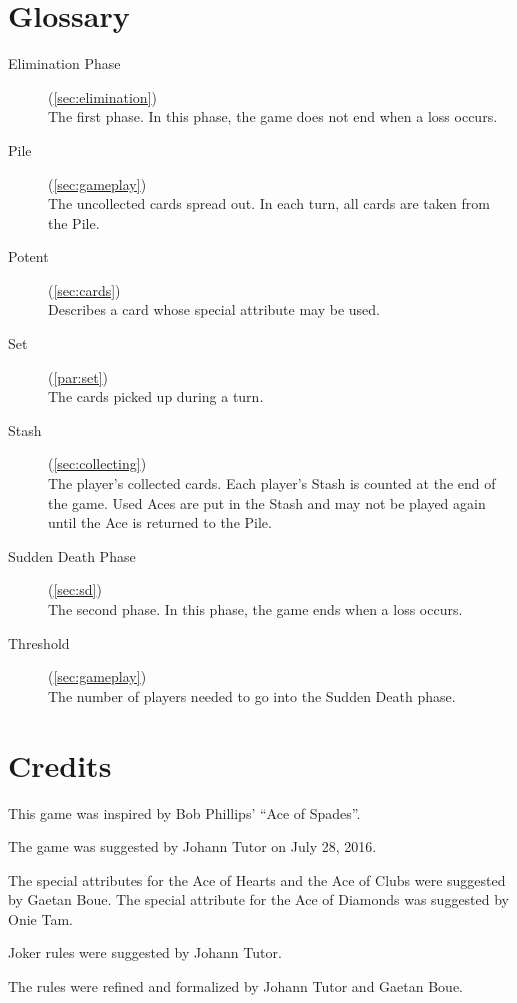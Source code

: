 \documentclass{article}
\begin{document}
\section{Glossary \label{sec:glossary}}
\begin{description}
  \item[Elimination Phase](\autoref{sec:elimination})\\
    The first phase. In this phase, the game does not end when a loss
    occurs.
  \item[Pile](\autoref{sec:gameplay})\\
    The uncollected cards spread out. In each turn, all cards are taken
    from the Pile.
  \item[Potent](\autoref{sec:cards})\\
    Describes a card whose special attribute may be used.
  \item[Set](\autoref{par:set})\\
    The cards picked up during a turn.
  \item[Stash](\autoref{sec:collecting})\\
    The player's collected cards. Each player's Stash is
    counted at the end of the game. Used Aces are put in the Stash and
    may not be played again until the Ace is returned to the Pile.
  \item[Sudden Death Phase](\autoref{sec:sd})\\
    The second phase. In this phase, the game ends when a loss occurs.
  \item[Threshold](\autoref{sec:gameplay})\\
    The number of players needed to go into the Sudden
    Death phase.
\end{description}

\newpage
\section{Credits \label{sec:credits}}

This game was inspired by Bob Phillips' ``Ace of Spades''.

The game was suggested by Johann Tutor on July 28, 2016.

The special attributes for the Ace of Hearts and the Ace of Clubs were
suggested by Gaetan Boue. The special attribute for the Ace of Diamonds
was suggested by Onie Tam.

Joker rules were suggested by Johann Tutor.

The rules were refined and formalized by Johann Tutor and Gaetan Boue.
\end{document}
